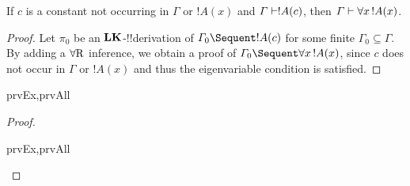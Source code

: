\documentclass[../../../include/open-logic-section]{subfiles}
\begin{document}

\begin{thm}
 If $c$ is a constant not occurring
in $\Gamma$ or $!A(x)$ and $\Gamma \Proves !A(c)$, then $\Gamma
\Proves \lforall[x][!A(x)]$.
\end{thm}

\begin{proof}
Let $\pi_0$ be an $\mathbf{LK}$-!!{derivation} of $\Gamma_0 \Sequent !A(c)$
for some finite $\Gamma_0 \subseteq \Gamma$.  By adding a
$\RightR{\lforall}$ inference, we obtain a proof of $\Gamma_0 \Sequent
\lforall[x][!A(x)]$, since $c$ does not occur in $\Gamma$ or $!A(x)$
and thus the eigenvariable condition is satisfied.
\end{proof}

\begin{thm}
\begin{tagenumerate}{prvEx,prvAll}
\end{tagenumerate}
\end{thm}

\begin{proof}
\begin{tagenumerate}{prvEx,prvAll}
\end{tagenumerate}
\end{proof}
\end{document}
